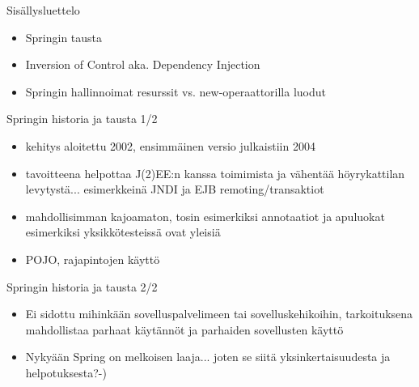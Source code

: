 \documentclass[hyperref={pdfauthor=\AUTHOR},14pt]{beamer}
\author{\AUTHOR}
\title[\TITLE]{\TITLE}
\date{\DATE}
\begin{document}
\begin{frame}[plain]
\titlepage
\end{frame}

\begin{frame}[t, fragile]{Sisällysluettelo}
\begin{itemize}
\item Springin tausta
\item Inversion of Control aka. Dependency Injection
\item Springin hallinnoimat resurssit vs. new-operaattorilla luodut
\end{itemize}
\end{frame}

\begin{frame}{Springin historia ja tausta 1/2}
\begin{itemize}
\item kehitys aloitettu 2002, ensimmäinen versio julkaistiin 2004
\item tavoitteena helpottaa J(2)EE:n kanssa toimimista ja vähentää
  höyrykattilan levytystä... esimerkkeinä JNDI ja EJB remoting/transaktiot
\item mahdollisimman kajoamaton, tosin esimerkiksi annotaatiot ja
  apuluokat esimerkiksi yksikkötesteissä ovat yleisiä
\item POJO, rajapintojen käyttö
\end{itemize}
\end{frame}

\begin{frame}{Springin historia ja tausta 2/2}
\begin{itemize}
\item Ei sidottu mihinkään sovelluspalvelimeen tai sovelluskehikoihin,
  tarkoituksena mahdollistaa parhaat käytännöt ja parhaiden
  sovellusten käyttö
\item Nykyään Spring on melkoisen laaja... joten se siitä
  yksinkertaisuudesta ja helpotuksesta?-)
\end{itemize}
\end{frame}
\end{document}

